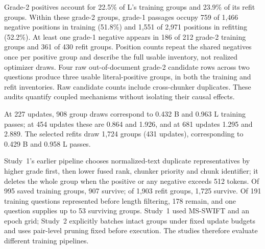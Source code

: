 Grade-2 positives account for 22.5\% of L's training groups and 23.9\% of its refit groups. Within these grade-2 groups, grade-1 passages occupy 759 of 1,466 negative positions in training (51.8\%) and 1,551 of 2,971 positions in refitting (52.2\%). At least one grade-1 negative appears in 186 of 212 grade-2 training groups and 361 of 430 refit groups. Position counts repeat the shared negatives once per positive group and describe the full usable inventory, not realized optimizer draws. Four raw out-of-document grade-2 candidate rows across two questions produce three usable literal-positive groups, in both the training and refit inventories. Raw candidate counts include cross-chunker duplicates. These audits quantify coupled mechanisms without isolating their causal effects.

At 227 updates, 908 group draws correspond to 0.432 B and 0.963 L training passes; at 454 updates these are 0.864 and 1.926, and at 681 updates 1.295 and 2.889. The selected refits draw 1,724 groups (431 updates), corresponding to 0.429 B and 0.958 L passes.

Study~1's earlier pipeline chooses normalized-text duplicate representatives by higher grade first, then lower fused rank, chunker priority and chunk identifier; it deletes the whole group when the positive or any negative exceeds 512 tokens. Of 995 saved training groups, 907 survive; of 1,903 refit groups, 1,725 survive. Of 191 training questions represented before length filtering, 178 remain, and one question supplies up to 53 surviving groups. Study~1 used MS-SWIFT and an epoch grid; Study~2 explicitly batches intact groups under fixed update budgets and uses pair-level pruning fixed before execution. The studies therefore evaluate different training pipelines.

